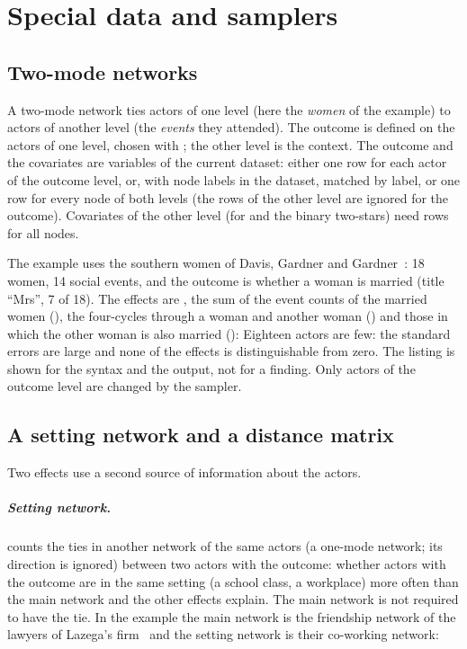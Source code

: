 \chapter{Special data and samplers}\label{ch:special}

\section{Two-mode networks}\label{sec:twomode}

A two-mode network ties actors of one level (here the \emph{women} of the example) to actors of another level (the \emph{events} they attended). The outcome is defined on the actors of one level, chosen with ; the other level is the context. The outcome and the covariates are variables of the current dataset: either one row for each actor of the outcome level, or, with node labels in the dataset, matched by label, or one row for every node of both levels (the rows of the other level are ignored for the outcome). Covariates of the other level (for  and the binary two-stars) need rows for all nodes.

The example uses the southern women of Davis, Gardner and Gardner~\cite{davis1941}: 18 women, 14 social events, and the outcome is whether a woman is married (title ``Mrs'', 7 of 18). The effects are , the sum of the event counts of the married women (), the four-cycles through a woman and another woman () and those in which the other woman is also married ():
Eighteen actors are few: the standard errors are large and none of the effects is distinguishable from zero. The listing is shown for the syntax and the output, not for a finding. Only actors of the outcome level are changed by the sampler.

\section{A setting network and a distance matrix}\label{sec:setting}

Two effects use a second source of information about the actors.

\paragraph{Setting network.}  counts the ties in another network of the same actors (a one-mode network; its direction is ignored) between two actors with the outcome: whether actors with the outcome are in the same setting (a school class, a workplace) more often than the main network and the other effects explain. The main network is not required to have the tie. In the example the main network is the friendship network of the lawyers of Lazega's firm~\cite{lazega2001} and the setting network is their co-working network:

